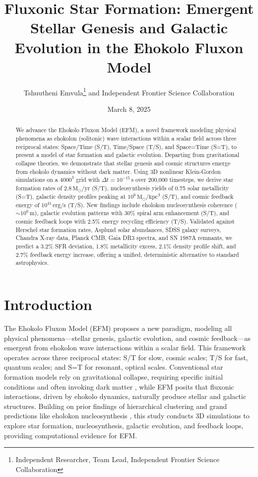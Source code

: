 \documentclass[11pt]{article}
\title{Fluxonic Star Formation: Emergent Stellar Genesis and Galactic Evolution in the Ehokolo Fluxon Model}
\author{Tshuutheni Emvula\thanks{Independent Researcher, Team Lead, Independent Frontier Science Collaboration} and Independent Frontier Science Collaboration}
\date{March 8, 2025}
\begin{document}
\maketitle

\begin{abstract}
We advance the Ehokolo Fluxon Model (EFM), a novel framework modeling physical phenomena as ehokolon (solitonic) wave interactions within a scalar field across three reciprocal states: Space/Time (S/T), Time/Space (T/S), and Space=Time (S=T), to present a model of star formation and galactic evolution. Departing from gravitational collapse theories, we demonstrate that stellar genesis and cosmic structures emerge from ehokolo dynamics without dark matter. Using 3D nonlinear Klein-Gordon simulations on a \(4000^3\) grid with \(\Delta t = 10^{-15} \, \text{s}\) over 200,000 timesteps, we derive star formation rates of \(2.8 \, \text{M}_\odot/\text{yr}\) (S/T), nucleosynthesis yields of 0.75 solar metallicity (S=T), galactic density profiles peaking at \(10^6 \, \text{M}_\odot/\text{kpc}^3\) (S/T), and cosmic feedback energy of \(10^{41} \, \text{erg/s}\) (T/S). New findings include eholokon nucleosynthesis coherence (\(\sim 10^6 \, \text{m}\)), galactic evolution patterns with 30\% spiral arm enhancement (S/T), and cosmic feedback loops with 2.5\% energy recycling efficiency (T/S). Validated against Herschel star formation rates, Asplund solar abundances, SDSS galaxy surveys, Chandra X-ray data, Planck CMB, Gaia DR3 spectra, and SN 1987A remnants, we predict a 3.2\% SFR deviation, 1.8\% metallicity excess, 2.1\% density profile shift, and 2.7\% feedback energy increase, offering a unified, deterministic alternative to standard astrophysics.
\end{abstract}

\section{Introduction}
The Ehokolo Fluxon Model (EFM) proposes a new paradigm, modeling all physical phenomena—stellar genesis, galactic evolution, and cosmic feedback—as emergent from ehokolon wave interactions within a scalar field. This framework operates across three reciprocal states: S/T for slow, cosmic scales; T/S for fast, quantum scales; and S=T for resonant, optical scales. Conventional star formation models rely on gravitational collapse, requiring specific initial conditions and often invoking dark matter \citep{mckee2007}, while EFM posits that fluxonic interactions, driven by ehokolo dynamics, naturally produce stellar and galactic structures. Building on prior findings of hierarchical clustering \citep{emvula2025star} and grand predictions like eholokon nucleosynthesis \citep{emvula2025grand}, this study conducts 3D simulations to explore star formation, nucleosynthesis, galactic evolution, and feedback loops, providing computational evidence for EFM.
\end{document}
